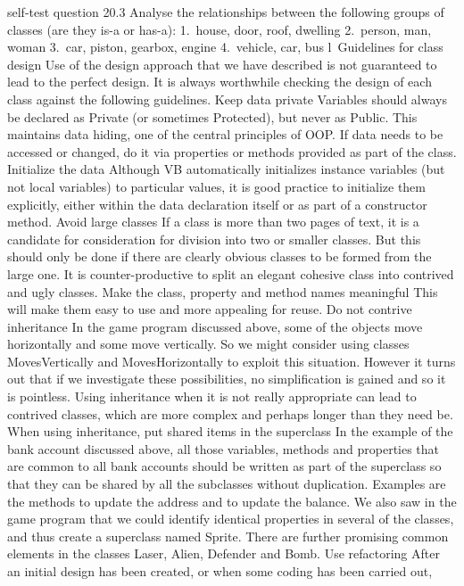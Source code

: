 self-test question
20.3	Analyse the relationships between the following groups of classes (are they is-a or has-a):
	1. house, door, roof, dwelling
	2. person, man, woman
	3. car, piston, gearbox, engine
	4. vehicle, car, bus
l Guidelines for class design
Use of the design approach that we have described is not guaranteed to lead to the
perfect design. It is always worthwhile checking the design of each class against the 
following guidelines.
Keep data private
Variables should always be declared as Private (or sometimes Protected), but never 
as Public. This maintains data hiding, one of the central principles of OOP. If data needs to be accessed or changed, do it via properties or methods provided as part of 
the class.
Initialize the data
Although VB automatically initializes instance variables (but not local variables) to 
particular values, it is good practice to initialize them explicitly, either within the data declaration itself or as part of a constructor method.
Avoid large classes
If a class is more than two pages of text, it is a candidate for consideration for division into two or smaller classes. But this should only be done if there are clearly obvious classes to be formed from the large one. It is counter-productive to split an elegant cohesive class into contrived and ugly classes.
Make the class, property and method names meaningful
This will make them easy to use and more appealing for reuse.
Do not contrive inheritance
In the game program discussed above, some of the objects move horizontally and 
some move vertically. So we might consider using classes MovesVertically and MovesHorizontally to exploit this situation. However it turns out that if we investigate these possibilities, no simpliﬁcation is gained and so it is pointless.
Using inheritance when it is not really appropriate can lead to contrived classes, which are more complex and perhaps longer than they need be.
When using inheritance, put shared items in the superclass
In the example of the bank account discussed above, all those variables, methods and properties that are common to all bank accounts should be written as part of the superclass so that they can be shared by all the subclasses without duplication. Examples are the methods to update the address and to update the balance.
We also saw in the game program that we could identify identical properties in several of the classes, and thus create a superclass named Sprite. There are further promising common elements in the classes Laser, Alien, Defender and Bomb.
Use refactoring
After an initial design has been created, or when some coding has been carried out, 
